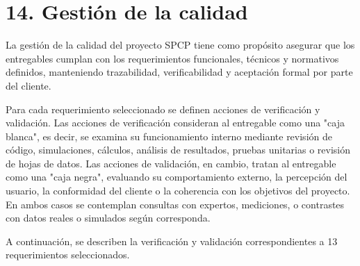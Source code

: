 \documentclass[12pt]
{charter}
\begin{document}
\section{14. Gestión de la calidad}
\label{sec:calidad}

La gestión de la calidad del proyecto SPCP tiene como propósito asegurar que los entregables cumplan con los requerimientos funcionales, técnicos y normativos definidos, manteniendo trazabilidad, verificabilidad y aceptación formal por parte del cliente.  

Para cada requerimiento seleccionado se definen acciones de verificación y validación.  
Las acciones de verificación consideran al entregable como una "caja blanca", es decir, se examina su funcionamiento interno mediante revisión de código, simulaciones, cálculos, análisis de resultados, pruebas unitarias o revisión de hojas de datos.  
Las acciones de validación, en cambio, tratan al entregable como una "caja negra", evaluando su comportamiento externo, la percepción del usuario, la conformidad del cliente o la coherencia con los objetivos del proyecto.  
En ambos casos se contemplan consultas con expertos, mediciones, o contrastes con datos reales o simulados según corresponda.

A continuación, se describen la verificación y validación correspondientes a 13 requerimientos seleccionados.
\end{document}
